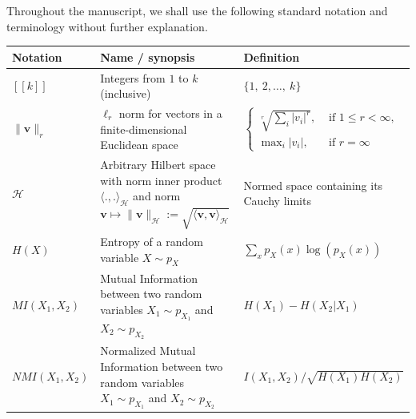 \documentclass[nobib, a4paper, notoc, twoside, justified, openany]{tufte-book}
\providecommand{\B}[1]{\mathbf{#1}}
\def\v{\mathbf{v}}
\begin{document}
Throughout the manuscript, we shall use the following standard notation
and terminology without further explanation.

\begin{fullwidth}
\def\arraystretch{1.5}
\begin{longtable}{p{2cm} | p{6cm} | p{9cm}}
\cmidrule{1-3}
Notation & Name / synopsis & Definition\\ 
  \midrule
  $[\![k]\!]$ & Integers from $1$ to $k$ (inclusive) & $\{1,~2, \ldots,~k \}$ \\
  $\| \B{v} \|_r$ & $\ell_r$ norm for vectors in  a finite-dimensional Euclidean space & $\begin{cases}\sqrt[r]{\sum_i |v_i|^r},&\mbox{ if }1 \le r < \infty,\\\max_{i}|v_i|,&\mbox { if }r = \infty\end{cases}$ \\
  $\mathcal H$ & Arbitrary Hilbert space with norm inner product $\langle .,.\rangle_{\mathcal H}$ and norm $\v \mapsto \|\v\|_{\mathcal H} := \sqrt{\langle \v,\v\rangle_{\mathcal H}}$& Normed space containing its Cauchy limits\\
$H(X)$ & Entropy of a random variable $X \sim p_X$ & $\sum_{x}p_{X}(x)\log(p_{X}(x))$\\
$MI(X_1,X_2)$ & Mutual Information between two random variables $X_1 \sim p_{X_1}$ and $X_2 \sim p_{X_2}$ & 
$ H(X_1) - H(X_2|X_1)$\\

 $NMI(X_1,X_2)$ & Normalized Mutual Information between two random variables $X_1 \sim p_{X_1}$ and $X_2 \sim p_{X_2}$ & $I(X_1,X_2)/\sqrt{H(X_1)H(X_2)}$ \\


\end{longtable}
\end{fullwidth}
\end{document}
